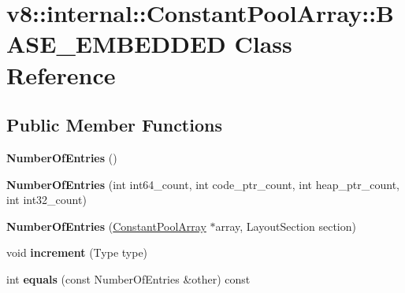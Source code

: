 \hypertarget{classv8_1_1internal_1_1_constant_pool_array_1_1_b_a_s_e___e_m_b_e_d_d_e_d}{}\section{v8\+:\+:internal\+:\+:Constant\+Pool\+Array\+:\+:B\+A\+S\+E\+\_\+\+E\+M\+B\+E\+D\+D\+E\+D Class Reference}
\label{classv8_1_1internal_1_1_constant_pool_array_1_1_b_a_s_e___e_m_b_e_d_d_e_d}
\subsection*{Public Member Functions}
\begin{DoxyCompactItemize}
\item 
\hypertarget{classv8_1_1internal_1_1_constant_pool_array_1_1_b_a_s_e___e_m_b_e_d_d_e_d_a872fb80f0713ed16f76a48bbe5df5a45}{}{\bfseries Number\+Of\+Entries} ()\label{classv8_1_1internal_1_1_constant_pool_array_1_1_b_a_s_e___e_m_b_e_d_d_e_d_a872fb80f0713ed16f76a48bbe5df5a45}

\item 
\hypertarget{classv8_1_1internal_1_1_constant_pool_array_1_1_b_a_s_e___e_m_b_e_d_d_e_d_a22c34ec6444952732ff9b3b5e4195897}{}{\bfseries Number\+Of\+Entries} (int int64\+\_\+count, int code\+\_\+ptr\+\_\+count, int heap\+\_\+ptr\+\_\+count, int int32\+\_\+count)\label{classv8_1_1internal_1_1_constant_pool_array_1_1_b_a_s_e___e_m_b_e_d_d_e_d_a22c34ec6444952732ff9b3b5e4195897}

\item 
\hypertarget{classv8_1_1internal_1_1_constant_pool_array_1_1_b_a_s_e___e_m_b_e_d_d_e_d_a41bf63dfcc1b0464439301a28a550c86}{}{\bfseries Number\+Of\+Entries} (\hyperlink{classv8_1_1internal_1_1_constant_pool_array}{Constant\+Pool\+Array} $\ast$array, Layout\+Section section)\label{classv8_1_1internal_1_1_constant_pool_array_1_1_b_a_s_e___e_m_b_e_d_d_e_d_a41bf63dfcc1b0464439301a28a550c86}

\item 
\hypertarget{classv8_1_1internal_1_1_constant_pool_array_1_1_b_a_s_e___e_m_b_e_d_d_e_d_a9d92a3186045789b915851e4fcb97f3d}{}void {\bfseries increment} (Type type)\label{classv8_1_1internal_1_1_constant_pool_array_1_1_b_a_s_e___e_m_b_e_d_d_e_d_a9d92a3186045789b915851e4fcb97f3d}

\item 
\hypertarget{classv8_1_1internal_1_1_constant_pool_array_1_1_b_a_s_e___e_m_b_e_d_d_e_d_a0d1af7689156782d44d238e7ced91110}{}int {\bfseries equals} (const Number\+Of\+Entries \&other) const \label{classv8_1_1internal_1_1_constant_pool_array_1_1_b_a_s_e___e_m_b_e_d_d_e_d_a0d1af7689156782d44d238e7ced91110}


\end{DoxyCompactItemize}
